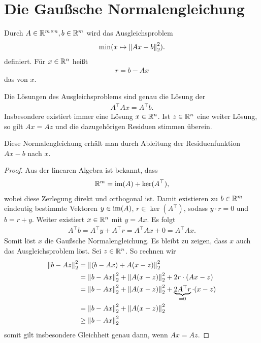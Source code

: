 \documentclass{report}
\begin{document}
\section{Die Gaußsche Normalengleichung}
\begin{definition}
	Durch $A \in \mathbb{R}^{m \times n}, b \in \mathbb{R}^m$ wird das Ausgleichsproblem 
	\begin{align*}
		\min (x \mapsto \norm{Ax - b}_2^2).
	\end{align*}
	definiert. Für $x \in \mathbb{R}^n$ heißt
	\begin{align*}
		r= b - Ax
	\end{align*}
	das  von $x$.
\end{definition}
\begin{theorem}
	Die Lösungen des Ausgleichsproblems sind genau die Lösung der 
	\begin{align*}
		A^\top Ax = A^\top b.
	\end{align*}
	Insbesondere existiert immer eine Lösung $x \in \mathbb{R}^n$. Ist $z \in \mathbb{R}^n$ eine weiter Lösung, so gilt $Ax = Az$ und die dazugehörigen Residuen stimmen überein.
\end{theorem}
\noindent Diese Normalengleichung erhält man durch Ableitung der Residuenfunktion $Ax-b$ nach $x$.
\newpar
\begin{proof}
	Aus der linearen Algebra ist bekannt, dass
	\begin{align*}
		\mathbb{R}^m = \textnormal{im}(A) + \ker(A^\top),
	\end{align*}
	wobei diese Zerlegung direkt und orthogonal ist. Damit existieren zu $b \in \mathbb{R}^m$ eindeutig bestimmte Vektoren $y \in \textnormal{im}(A)$, $r \in \ker(A^\top)$, sodass $y \cdot r = 0$ und $b = r + y$. Weiter existiert $x \in \mathbb{R}^n$ mit $y = Ax$.
	\newpar
	Es folgt
	\begin{align*}
		A^\top b = A^\top y + A^\top r = A^\top Ax + 0 = A^\top Ax.
	\end{align*}
	Somit löst $x$ die Gaußsche Normalengleichung. Es bleibt zu zeigen, dass $x$ auch das Ausgleichsproblem löst. Sei $z \in \mathbb{R}^n$. So rechnen wir
	\begin{align*}
		\norm{b-Az}_2^2 &= \norm{(b - Ax) + A(x-z)}_2^2\\
						&= \norm{b - Ax}_2^2 + \norm{A(x-z)}_2^2 + 2r \cdot (Ax - z)\\
						&= \norm{b - Ax}_2^2 + \norm{A(x-z)}_2^2 + \underbrace{2A^\top r}_{= 0} \cdot (x - z)\\
						&= \norm{b - Ax}_2^2 + \norm{A(x-z)}_2^2\\
						&\geq \norm{b - Ax}_2^2
	\end{align*}
	somit gilt insbesondere Gleichheit genau dann, wenn $Ax = Az$.
\end{proof}
\end{document}
